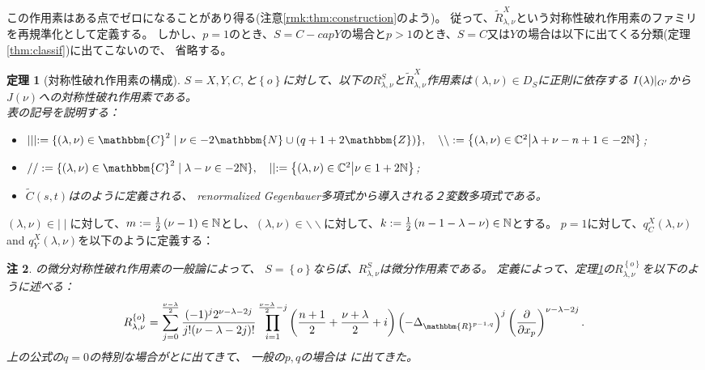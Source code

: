 \documentclass[12pt]{article} %
\newcommand{\assign}{:=}
\newtheorem{theorem}{定理}
\newtheorem{remark}[theorem]{注}
\theoremstyle{definition}
\theoremstyle{exampstyle} \newtheorem{examp}[theorem]{Theorem}
\newcommand{\IlambdaGprime}{I(\lambda)\kern-0.3em\mid_{G'}}
\newcommand{\bb}{\backslash\backslash}
\begin{document}
この作用素はある点でゼロになることがあり得る(注意\ref{rmk:thm:construction}のよう)。
従って、$\tilde{R}^X_{\lambda,\nu}$という対称性破れ作用素のファミリを再規準化として定義する。
しかし、$p=1$のとき、$S=C-cap Y$の場合と$p>1$のとき、$S=C$又は$Y$の場合は以下に出てくる分類(定理\ref{thm:classif})に出てこないので、
省略する。
\newpage
\begin{theorem}[対称性破れ作用素の構成]\label{thm:construction}
	$S=X,Y,C,$と$\left\{ o \right\}$に対して、以下の$R_{\lambda,\nu}^S$と$\tilde{R}_{\lambda,\nu}^X$作用素は$(\lambda,\nu)\in D_S$に正則に依存する
	$\IlambdaGprime$から$J(\nu)$への対称性破れ作用素である。\\
\vspace{\baselineskip}
表の記号を説明する：
\begin{itemize}
	\item $\mid \mid \mid \assign \{ (\lambda, \nu) \in \mathbbm{C}^2 \mid \nu \in
	- 2\mathbbm{N} \cup (q + 1 + 2\mathbbm{Z}) \},\quad \backslash\backslash:=\mysetn{(\lambda,\nu)\in\C^2}{\lambda+\nu-n+1\in-2\N}$;
\item $/ / \assign
\{ (\lambda, \nu) \in \mathbbm{C}^2 \mid \lambda - \nu \in
-2\N \},\quad \mid\mid:=\mysetn{(\lambda,\nu)\in\C^2}{\nu\in1+2\N}$;
\item $\tilde{C}(s,t)$は\cite[(16.3)]{kobayashi2015symmetry}のように定義される、
	renormalized Gegenbauer多項式から導入される２変数多項式である。
\end{itemize}
\end{theorem}
$(\lambda,\nu)\in\mid\mid$に対して、$m:=\frac{1}{2}\left( \nu-1 \right)\in\mathbb{N}$とし、$(\lambda,\nu)\in\bb$に対して、$k:=\frac{1}{2}\left( n-1-\lambda-\nu \right)\in\mathbb{N}$とする。
$p=1$に対して、$q_C^X(\lambda,\nu)$ and $q_Y^X(\lambda,\nu)$を以下のように定義する：
\begin{remark}
	\cite[Chap.\ 2]{kobayashi2016differential1}の微分対称性破れ作用素の一般論によって、
	$S=\left\{ o \right\}$ならば、$R_{\lambda,\nu}^S$は微分作用素である。
	定義によって、定理\ref{thm:construction}の$R_{\lambda,\nu}^{ \left\{ o \right\}}$を以下のように述べる：
	\begin{equation*}
		R_{\lambda,\nu}^{ \left\{ o \right\}}=
		\sum_{j=0}^{\frac{\nu-\lambda}{2}}\frac{(-1)^j2^{\nu-\lambda-2j}}{j!(\nu-\lambda-2j)!}\prod_{i=1}^{\frac{\nu-\lambda}{2}-j}\left( \frac{n
		+1}{2}+\frac{\nu+\lambda}{2}
		+i \right)\left(- \Delta_{\mathbbm{R}^{p-1,q}} \right)^j\left( \frac{\partial}{\partial x_p} \right)^{\nu-\lambda-2j}.
	\end{equation*}
	上の公式の$q=0$の特別な場合が\cite[Thms. 5.1.1 and 5.2.1]{juhl2009families}と\cite[(10.1)]{kobayashi2015symmetry}に出てきて、
	一般の$p,q$の場合は
	\cite[Thm.\ 4.3]{kobayashi2015branching}に出てきた。
\end{remark}
\end{document}
